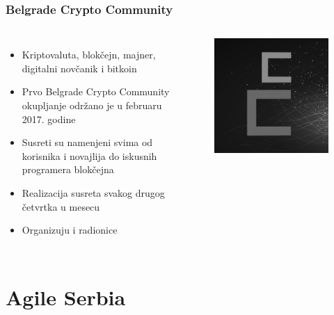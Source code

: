 \documentclass[hyperref={bookmarks=false},aspectratio=169]{beamer}
\begin{document}
\begin{frame}
\frametitle{Belgrade Crypto Community}

\begin{columns}[T]

\begin{itemize}
    \item Kriptovaluta, blokčejn, majner, digitalni novčanik i bitkoin
    \item Prvo Belgrade Crypto Community okupljanje održano je u februaru 2017. godine
    \item Susreti su namenjeni svima od korisnika i novajlija do iskusnih programera blokčejna
    \item Realizacija susreta svakog drugog četvrtka u mesecu
    \item Organizuju i radionice
\end{itemize}



\begin{figure}
    \raggedleft
    \includegraphics[scale=0.3]{./images/bcc_logo.png}
\end{figure}

\end{columns}
\end{frame}


\section{Agile Serbia}
\end{document}
